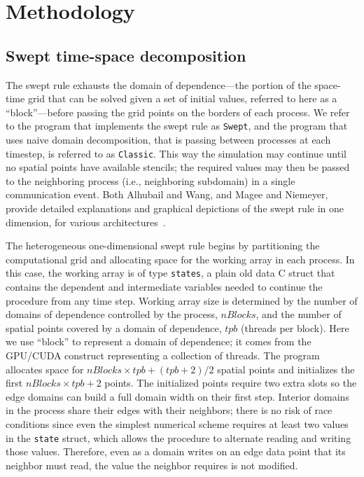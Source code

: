 
\section{Methodology} \label{sec:hMethods}

\subsection{Swept time-space decomposition}

The swept rule exhausts the domain of dependence---the portion of the space-time grid that can be solved given a set of initial values, referred to here as a ``block''---before passing the grid points on the borders of each process.
We refer to the program that implements the swept rule as \texttt{Swept}, and the program that uses naive domain decomposition, that is passing between processes at each timestep, is referred to as \texttt{Classic}.
This way the simulation may continue until no spatial points have available stencils; the required values may then be passed to the neighboring process (i.e., neighboring subdomain) in a single communication event.
Both Alhubail and Wang, and Magee and Niemeyer, provide detailed explanations and graphical depictions
of the swept rule in one dimension, for various architectures~\cite{alhubail:16jcp, OurJCP}.

The heterogeneous one-dimensional swept rule begins by partitioning the computational grid and
allocating space for the working array in each process.
In this case, the working array is of type \texttt{states}, a plain old data C struct that contains the
dependent and intermediate variables needed to continue the procedure from any time step.
Working array size is determined by the number of domains of dependence controlled by the process,
$nBlocks$, and the number of spatial points covered by a domain of dependence, $tpb$ (threads per block).
Here we use ``block'' to represent a domain of dependence; it comes from the GPU\slash CUDA
construct representing a collection of threads.
The program allocates space for $nBlocks \times tpb + (tpb+2)/2$ spatial points and initializes the
first $nBlocks \times tpb + 2$ points.
The initialized points require two extra slots so the edge domains
can build a full domain width on their first step.
Interior domains in the process share their edges with their neighbors; there is no risk of
race conditions since even the simplest numerical scheme requires at least two values in the
\texttt{state} struct, which allows the procedure to alternate reading and writing those values.
Therefore, even as a domain writes on an edge data point that its neighbor must read,
the value the neighbor requires is not modified.

